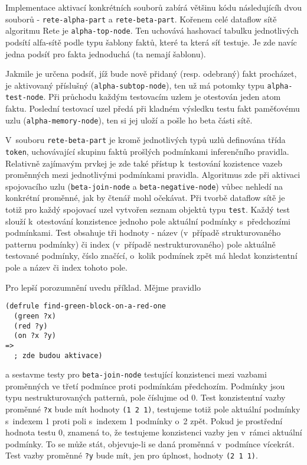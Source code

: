 Implementace aktivací konkrétních souborů zabírá většinu kódu následujícíh dvou
souborů - \verb|rete-alpha-part| a \verb|rete-beta-part|. Kořenem celé dataflow
sítě algoritmu Rete je \verb|alpha-top-node|. Ten uchovává hashovací tabulku
jednotlivých podsítí alfa-sítě podle typu šablony faktů, které ta která síť
testuje. Je zde navíc jedna podsíť pro fakta jednoduchá (ta nemají šablonu).

Jakmile je určena podsíť, jíž bude nově přidaný (resp. odebraný) fakt procházet,
je aktivovaný příslušný  (\verb|alpha-subtop-node|), ten už má
potomky typu \verb|alpha-test-node|. Při průchodu každým testovacím uzlem je
otestován jeden atom faktu. Poslední testovací uzel předá při kladném výsledku
testu fakt paměťovému uzlu (\verb|alpha-memory-node|), ten si jej uloží
a pošle ho beta části sítě.

V~souboru \verb|rete-beta-part| je kromě jednotlivých typů uzlů definována třída
\verb|token|, uchovávající skupinu faktů prošlých podmínkami inferenčního 
pravidla. Relativně zajímavým prvkej je zde také přístup k~testování  kozistence
vazeb proměnných mezi jednotlivými podmínkami pravidla. Algoritmus zde při
aktivaci spojovacího uzlu (\verb|beta-join-node| a \verb|beta-negative-node|)
vůbec nehledí na konkrétní proměnné, jak by čtenář mohl očekávat. Při tvorbě
dataflow sítě je totiž pro každý spojovací uzel vytvořen seznam objektů typu
\verb|test|. Každý test slouží k~otestování konzistence jednoho pole aktuální
podmínky s~předchozími podmínkami. Test obsahuje tři hodnoty - název (v~případě
strukturovaného patternu podmínky) či index (v~případě nestrukturovaného)
pole aktuálně testované podmínky, číslo značící, o~kolik podmínek zpět má hledat
konzistentní pole a název či index tohoto pole.

Pro lepší porozumnění uvedu příklad. Mějme pravidlo
\begin{verbatim}
(defrule find-green-block-on-a-red-one
  (green ?x)
  (red ?y)
  (on ?x ?y)
=>
  ; zde budou aktivace)
\end{verbatim}
a sestavme testy pro \verb|beta-join-node| testující konzistenci mezi vazbami
proměnných ve třetí podmínce proti podmínkám předchozím. Podmínky jsou typu
nestrukturovaných patternů, pole číslujme od 0. Test konzistentní vazby
proměnné \verb|?x| bude mít hodnoty \verb|(1 2 1)|, testujeme totiž pole
aktuální podmínky s~indexem 1 proti poli s~indexem 1 podmínky o~2 zpět.
Pokud je prostřední hodnota testu 0, znamená to, že testujeme konzistenci vazby
jen v~rámci aktuální podmínky. To se může stát, objevuje-li se daná proměnná
v~podmínce vícekrát. Test vazby proměnné \verb|?y| bude mít, jen pro úplnost,
hodnoty \verb|(2 1 1)|.

